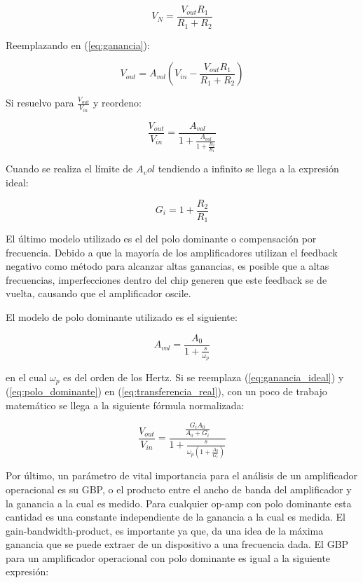 \begin{equation}
V_N = \frac{V_{out}R_1}{R_1 + R_2}
\end{equation}

Reemplazando en (\ref{eq:ganancia}):

\begin{equation}
V_{out} = A_{vol}(V_{in} - \frac{V_{out}R_1}{R_1 + R_2})
\end{equation}

Si resuelvo para $\frac{V_{out}}{V_{in}}$ y reordeno:

\begin{equation}\label{eq:transferencia_real}
\frac{V_{out}}{V_{in}} = \frac{A_{vol}}{1 + \frac{A_{vol}}{1 + \frac{R_2}{R_1}}}
\end{equation}

Cuando se realiza el límite de $A_vol$ tendiendo a infinito se llega a la expresión ideal:

\begin{equation}\label{eq:ganancia_ideal}
G_i = 1 + \frac{R_2}{R_1}
\end{equation}

El último modelo utilizado es el del polo dominante o compensación por frecuencia. Debido a que la mayoría de los amplificadores utilizan el feedback negativo como método para alcanzar altas ganancias, es posible que a altas frecuencias, imperfecciones dentro del chip generen que este feedback se de vuelta, causando que el amplificador oscile. 


El modelo de polo dominante utilizado es el siguiente:

\begin{equation}\label{eq:polo_dominante}
A_{vol} = \frac{A_0}{1 + \frac{s}{\omega_p}}
\end{equation}

en el cual $\omega_p$ es del orden de los Hertz.
Si se reemplaza (\ref{eq:ganancia_ideal}) y (\ref{eq:polo_dominante}) en (\ref{eq:transferencia_real}), con un poco de trabajo matemático se llega a la siguiente fórmula normalizada:

\begin{equation}\label{eq:ganancia_completa_normalizada}
\frac{V_{out}}{V_{in}} = \frac{\frac{G_iA_0}{A_0 + G_i}}{1 + \frac{s}{\omega_p(1 + \frac{A_0}{G_i})}}
\end{equation}

Por último, un parámetro de vital importancia para el análisis de un amplificador operacional es su GBP, o el producto entre el ancho de banda del amplificador y la ganancia a la cual es medido. Para cualquier op-amp con polo dominante esta cantidad es una constante independiente de la ganancia a la cual es medida. El gain-bandwidth-product, es importante ya que, da una idea de la máxima ganancia que se puede extraer de un dispositivo a una frecuencia dada. El GBP para un amplificador operacional con polo dominante es igual a la siguiente expresión:

